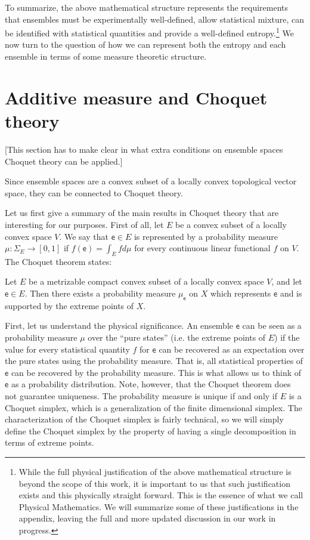\documentclass[10pt,twocolumn, nofootinbib]{revtex4-2}
\newcommand{\ens}[1][e] {\mathsf{#1}} %
\begin{document}
To summarize, the above mathematical structure represents the requirements that ensembles must be experimentally well-defined, allow statistical mixture, can be identified with statistical quantities and provide a well-defined entropy.\footnote{While the full physical justification of the above mathematical structure is beyond the scope of this work, it is important to us that such justification exists and this physically straight forward. This is the essence of what we call Physical Mathematics. We will summarize some of these justifications in the appendix, leaving the full and more updated discussion in our work in progress.} We now turn to the question of how we can represent both the entropy and each ensemble in terms of some measure theoretic structure.

\section{Additive measure and Choquet theory}

[This section has to make clear in what extra conditions on ensemble spaces Choquet theory can be applied.]

Since ensemble spaces are a convex subset of a locally convex topological vector space, they can be connected to Choquet theory.

Let us first give a summary of the main results in Choquet theory that are interesting for our purposes. First of all, let $E$ be a convex subset of a locally convex space $V$. We say that $\ens \in E$ is represented by a probability measure $\mu : \Sigma_{E} \to [0,1]$ if $f(\ens) = \int_E f d\mu$ for every continuous linear functional $f$ on $V$. The Choquet theorem states:
\begin{thrm}[Choquet]
	Let $E$ be a metrizable compact convex subset of a locally convex space $V$, and let $\ens \in E$. Then there exists a probability measure $\mu_{\ens}$ on $X$ which represents $\ens$ and is supported by the extreme points of $X$.
\end{thrm}

First, let us understand the physical significance. An ensemble $\ens$ can be seen as a probability measure $\mu$ over the ``pure states'' (i.e. the extreme points of $E$) if the value for every statistical quantity $f$ for $\ens$ can be recovered as an expectation over the pure states using the probability measure. That is, all statistical properties of $\ens$ can be recovered by the probability measure. This is what allows us to think of $\ens$ as a probability distribution. Note, however, that the Choquet theorem does not guarantee uniqueness. The probability measure is unique if and only if $E$ is a Choquet simplex, which is a generalization of the finite dimensional simplex. The characterization of the Choquet simplex is fairly technical, so we will simply define the Choquet simplex by the property of having a single decomposition in terms of extreme points.
\end{document}
